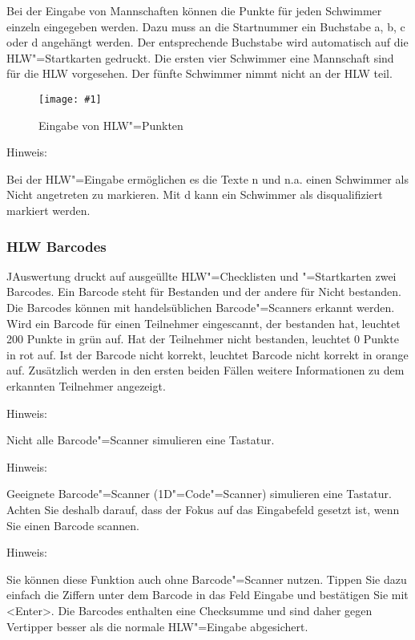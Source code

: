 \documentclass[11pt,a4paper,twoside,ngerman]{article}
\newcommand{\hsmimage}[3]{\begin{figure}[!ht]\centering\texttt{[image: \#1]}\caption{#3}\end{figure}}
\begin{document}
Bei der Eingabe von Mannschaften können die Punkte für jeden Schwimmer einzeln eingegeben werden. Dazu muss an die Startnummer ein Buchstabe \glqq{}a\grqq{}, \glqq{}b\grqq{}, \glqq{}c\grqq{} oder \glqq{}d\grqq{} angehängt werden. Der entsprechende Buchstabe wird automatisch auf die HLW"=Startkarten gedruckt. Die ersten vier Schwimmer eine Mannschaft sind für die HLW vorgesehen. Der fünfte Schwimmer nimmt nicht an der HLW teil.


\hsmimage{pics/panel-hlw-eingabe}{.72\textwidth}{Eingabe von HLW"=Punkten}
\begin{bfseries}Hinweis:\end{bfseries} Bei der HLW"=Eingabe ermöglichen es die Texte \glqq{}n\grqq{} und \glqq{}n.a.\grqq{} einen Schwimmer als \glqq{}Nicht angetreten\grqq{} zu markieren. Mit \glqq{}d\grqq{} kann ein Schwimmer als disqualifiziert markiert werden.


\subsubsection*{HLW Barcodes}
JAuswertung druckt auf ausgeüllte HLW"=Checklisten und "=Startkarten zwei Barcodes. Ein Barcode steht für \glqq{}Bestanden\grqq{} und der andere für \glqq{}Nicht bestanden\grqq{}. Die Barcodes können mit handelsüblichen Barcode"=Scanners erkannt werden. Wird ein Barcode für einen Teilnehmer eingescannt, der bestanden hat, leuchtet \glqq{}200 Punkte\grqq{} in grün auf. Hat der Teilnehmer nicht bestanden, leuchtet \glqq{}0 Punkte\grqq{} in rot auf. Ist der Barcode nicht korrekt, leuchtet \glqq{}Barcode nicht korrekt\grqq{} in orange auf. Zusätzlich werden in den ersten beiden Fällen weitere Informationen zu dem erkannten Teilnehmer angezeigt.

\begin{bfseries}Hinweis:\end{bfseries} Nicht alle Barcode"=Scanner simulieren eine Tastatur.

\begin{bfseries}Hinweis:\end{bfseries} Geeignete Barcode"=Scanner (1D"=Code"=Scanner) simulieren eine Tastatur. Achten Sie deshalb darauf, dass der Fokus auf das Eingabefeld gesetzt ist, wenn Sie einen Barcode scannen.

\begin{bfseries}Hinweis:\end{bfseries} Sie können diese Funktion auch ohne Barcode"=Scanner nutzen. Tippen Sie dazu einfach die Ziffern unter dem Barcode in das Feld \glqq{}Eingabe\grqq{} und bestätigen Sie mit \textless{}Enter\textgreater{}. Die Barcodes enthalten eine Checksumme und sind daher gegen Vertipper besser als die normale HLW"=Eingabe abgesichert.
\end{document}
